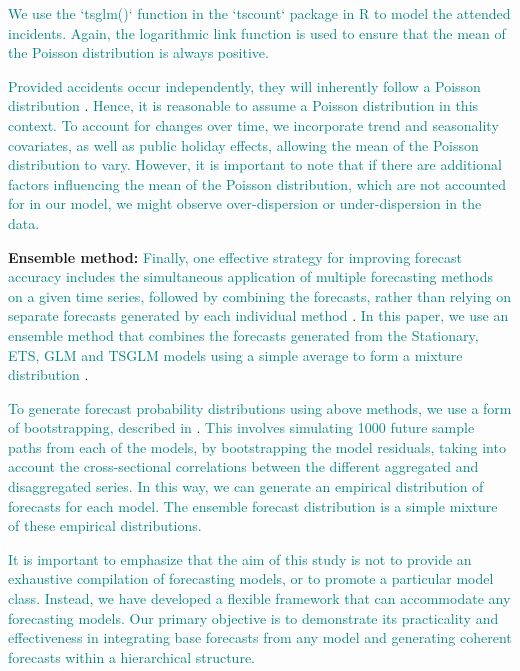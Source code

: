 \documentclass[
  authoryear,
  preprint,
  3p]{elsarticle}
\begin{document}
\textcolor{teal}{We use the `tsglm()` function in the `tscount` package in R}
\citep{JSSv082i05}
\textcolor{teal}{to model the attended incidents. Again, the logarithmic link function is used to ensure that the mean of the Poisson distribution is always positive.}

\textcolor{teal}{Provided accidents occur independently, they will inherently follow a Poisson distribution}
\citep[p156--158]{feller1991introduction}.
\textcolor{teal}{Hence, it is reasonable to assume a Poisson distribution in this context. To account for changes over time, we incorporate trend and seasonality covariates, as well as public holiday effects, allowing the mean of the Poisson distribution to vary. However, it is important to note that if there are additional factors influencing the mean of the Poisson distribution, which are not accounted for in our model, we might observe over-dispersion or under-dispersion in the data.}

\textbf{Ensemble method:}
\textcolor{teal}{Finally, one effective strategy for improving forecast accuracy includes the simultaneous application of multiple forecasting methods on a given time series, followed by combining the forecasts, rather than relying on separate forecasts generated by each individual method}
\citep{clemen1989combining}.
\textcolor{teal}{In this paper, we use an ensemble method that combines the forecasts generated from the Stationary, ETS, GLM and TSGLM models using a simple average to form a mixture distribution}
\citep{combinations}.

\textcolor{teal}{To generate forecast probability distributions using above methods, we use a form of bootstrapping, described in}
\citet{panagiotelis2023probabilistic}.
\textcolor{teal}{This involves simulating 1000 future sample paths from each of the models, by bootstrapping the model residuals, taking into account the cross-sectional correlations between the different aggregated and disaggregated series. In this way, we can generate an empirical distribution of forecasts for each model. The ensemble forecast distribution is a simple mixture of these empirical distributions.}

\textcolor{teal}{It is important to emphasize that the aim of this study is not to provide an exhaustive compilation of forecasting models, or to promote a particular model class. Instead, we have developed a flexible framework that can accommodate any forecasting models. Our primary objective is to demonstrate its practicality and effectiveness in integrating base forecasts from any model and generating coherent forecasts within a hierarchical structure.}
\end{document}
